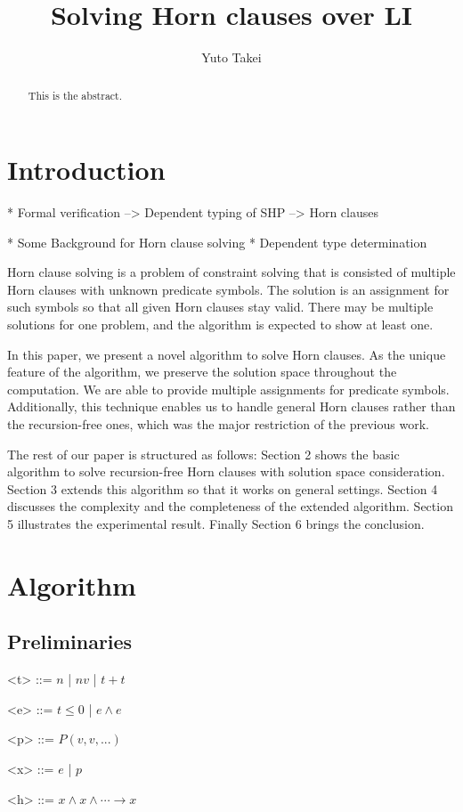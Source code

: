 \documentclass{llncs}
\title{Solving Horn clauses over LI}
\author{Yuto Takei}
\institute{The University of Tokyo}
\begin{document}
\maketitle
\begin{abstract}
  This is the abstract.
\end{abstract}

\section{Introduction}


* Formal verification
--> Dependent typing of SHP
--> Horn clauses

* Some
Background for Horn clause solving
* Dependent type determination

Horn clause solving is a problem of constraint solving that is consisted of multiple Horn clauses with unknown predicate symbols. The solution is an assignment for such symbols so that all given Horn clauses stay valid. There may be multiple solutions for one problem, and the algorithm is expected to show at least one.

In this paper, we present a novel algorithm to solve Horn clauses. As the unique feature of the algorithm, we preserve the solution space throughout the computation. We are able to provide multiple assignments for predicate symbols. Additionally, this technique enables us to handle general Horn clauses rather than the recursion-free ones, which was the major restriction of the previous work.

The rest of our paper is structured as follows: Section 2 shows the basic algorithm to solve recursion-free Horn clauses with solution space consideration. Section 3 extends this algorithm so that it works on general settings. Section 4 discusses the complexity and the completeness of the extended algorithm. Section 5 illustrates the experimental result. Finally Section 6 brings the conclusion.

\section{Algorithm}

\subsection{Preliminaries}



\setlength{\grammarindent}{6em}
\begin{grammar}

<t> ::= $n$ | $nv$ | $t + t$

<e> ::= $t \leq 0$ | $e \wedge e$

<p> ::= $P (v, v, ... )$

<x> ::= $e$ | $p$

<h> ::= $x \wedge x \wedge \cdots \longrightarrow x$

\end{grammar}
\end{document}
